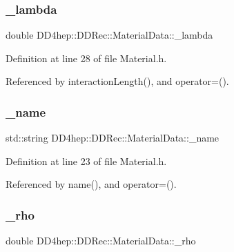 \subsubsection{\texorpdfstring{\+\_\+lambda}{\_lambda}}
{\footnotesize\ttfamily double D\+D4hep\+::\+D\+D\+Rec\+::\+Material\+Data\+::\+\_\+lambda\hspace{0.3cm}{\ttfamily [protected]}}



Definition at line 28 of file Material.\+h.



Referenced by interaction\+Length(), and operator=().

\hypertarget{class_d_d4hep_1_1_d_d_rec_1_1_material_data_aec3008cab8825e1aa3813043ebafb77a}{}\label{class_d_d4hep_1_1_d_d_rec_1_1_material_data_aec3008cab8825e1aa3813043ebafb77a} 
\subsubsection{\texorpdfstring{\+\_\+name}{\_name}}
{\footnotesize\ttfamily std\+::string D\+D4hep\+::\+D\+D\+Rec\+::\+Material\+Data\+::\+\_\+name\hspace{0.3cm}{\ttfamily [protected]}}



Definition at line 23 of file Material.\+h.



Referenced by name(), and operator=().

\hypertarget{class_d_d4hep_1_1_d_d_rec_1_1_material_data_a9589f3b1eeba21a241b7d17e469705a1}{}\label{class_d_d4hep_1_1_d_d_rec_1_1_material_data_a9589f3b1eeba21a241b7d17e469705a1} 
\subsubsection{\texorpdfstring{\+\_\+rho}{\_rho}}
{\footnotesize\ttfamily double D\+D4hep\+::\+D\+D\+Rec\+::\+Material\+Data\+::\+\_\+rho\hspace{0.3cm}{\ttfamily [protected]}}



